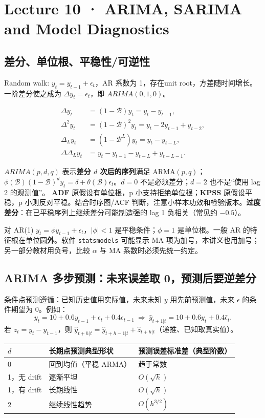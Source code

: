 \documentclass[UTF8,fontset=fandol,10.5pt,a4paper]{ctexart}
\newcommand{\eng}[1]{{\sffamily\color{navy}#1}}
\newcommand{\thick}{\renewcommand{\arraystretch}{1.18}}
\begin{document}
\section{Lecture 10 · ARIMA, SARIMA and Model Diagnostics}
\subsection{差分、单位根、平稳性/可逆性}
\eng{Random walk}: $y_t=y_{t-1}+\epsilon_t$，AR 系数为 1，存在\eng{unit root}，方差随时间增长。一阶差分使之成为 $\Delta y_t=\epsilon_t$，即 $ARIMA(0,1,0)$。
\begin{keybox}
\begin{align*}
\Delta y_t&=(1-\mathcal B)y_t=y_t-y_{t-1},\\
\Delta^2y_t&=(1-\mathcal B)^2y_t=y_t-2y_{t-1}+y_{t-2},\\
\Delta_Ly_t&=(1-\mathcal B^L)y_t=y_t-y_{t-L},\\
\Delta\Delta_Ly_t&=y_t-y_{t-1}-y_{t-L}+y_{t-L-1}.
\end{align*}
\end{keybox}
$ARIMA(p,d,q)$ 表示\textbf{差分 $d$ 次后的序列}满足 ARMA$(p,q)$；$\phi(\mathcal B)(1-\mathcal B)^dy_t=\delta+\theta(\mathcal B)\epsilon_t$。$d=0$ 不是必须差分；$d=2$ 也不是“使用 lag 2 的观测值”。
\textbf{ADF} 原假设有单位根，p 小支持拒绝单位根；\textbf{KPSS} 原假设平稳，p 小则反对平稳。结合时序图/ACF 判断，注意小样本功效和检验版本。\textbf{过度差分}：在已平稳序列上继续差分可能制造强的 lag 1 负相关（常见约 $-0.5$）。
\begin{pitbox}
对 \eng{AR(1)} $y_t=\phi y_{t-1}+\epsilon_t$，$|\phi|<1$ 是平稳条件；$\phi=1$ 是单位根。一般 AR 的特征根在单位圆\textbf{外}。软件 \texttt{statsmodels} 可能显示 MA 项为加号，本讲义也用加号；另一部分教材用负号，比较 $\alpha$ 与 MA 系数时必须先统一约定。
\end{pitbox}
\subsection{ARIMA 多步预测：未来误差取 0，预测后要逆差分}
条件点预测遵循：已知历史值用实际值，未来未知 $y$ 用先前预测值，未来 $\epsilon$ 的条件期望为 0。例如：
\[y_t=10+0.6y_{t-1}+\epsilon_t+0.4\epsilon_{t-1}\ \Longrightarrow\ \hat y_{t+1|t}=10+0.6y_t+0.4\hat\epsilon_t.\]
若 $z_t=y_t-y_{t-1}$，则 $\hat y_{t+h|t}=\hat y_{t+h-1|t}+\hat z_{t+h|t}$（递推、已知取真实值）。
\begin{center}\thick\begin{tabularx}{0.95\linewidth}{lXX}\toprule
$d$ & 长期点预测典型形状 & 预测误差标准差（典型阶数）\\\midrule
0 & 回到均值（平稳 ARMA） & 趋于常数 \\
1，无 drift & 逐渐平坦 & $O(\sqrt h)$ \\
1，有 drift & 长期线性 & $O(\sqrt h)$ \\
2 & 继续线性趋势 & $O(h^{3/2})$ \\
\bottomrule\end{tabularx}\end{center}
\end{document}
